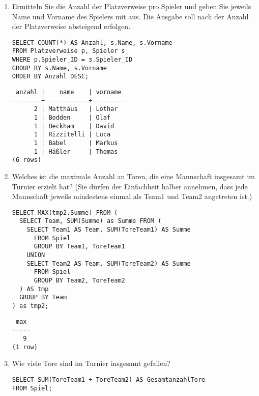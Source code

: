 \documentclass{bschlangaul-aufgabe}
\begin{document}
\begin{enumerate}


\item Ermitteln Sie die Anzahl der Platzverweise pro Spieler und geben
Sie jeweils Name und Vorname des Spielers mit aus. Die Ausgabe soll nach
der Anzahl der Platzverweise absteigend erfolgen.

\begin{bAntwort}
\begin{verbatim}
SELECT COUNT(*) AS Anzahl, s.Name, s.Vorname
FROM Platzverweise p, Spieler s
WHERE p.Spieler_ID = s.Spieler_ID
GROUP BY s.Name, s.Vorname
ORDER BY Anzahl DESC;
\end{verbatim}

\begin{verbatim}
 anzahl |    name    | vorname
--------+------------+---------
      2 | Matthäus   | Lothar
      1 | Bodden     | Olaf
      1 | Beckham    | David
      1 | Rizzitelli | Luca
      1 | Babel      | Markus
      1 | Häßler     | Thomas
(6 rows)
\end{verbatim}
\end{bAntwort}


\item Welches ist die maximale Anzahl an Toren, die eine Mannschaft
insgesamt im Turnier erzielt hat? (Sie dürfen der Einfachheit halber
annehmen, dass jede Mannschaft jeweils mindestens einmal als Team1 und
Team2 angetreten ist.)

\begin{bAntwort}
\begin{verbatim}
SELECT MAX(tmp2.Summe) FROM (
  SELECT Team, SUM(Summe) as Summe FROM (
    SELECT Team1 AS Team, SUM(ToreTeam1) AS Summe
      FROM Spiel
      GROUP BY Team1, ToreTeam1
    UNION
    SELECT Team2 AS Team, SUM(ToreTeam2) AS Summe
      FROM Spiel
      GROUP BY Team2, ToreTeam2
  ) AS tmp
  GROUP BY Team
) as tmp2;
\end{verbatim}

\begin{verbatim}
 max
-----
   9
(1 row)
\end{verbatim}
\end{bAntwort}


\item Wie viele Tore sind im Turnier insgesamt gefallen?

\begin{bAntwort}
\begin{verbatim}
SELECT SUM(ToreTeam1 + ToreTeam2) AS GesamtanzahlTore
FROM Spiel;
\end{verbatim}
\end{bAntwort}


\end{enumerate}
\end{document}
